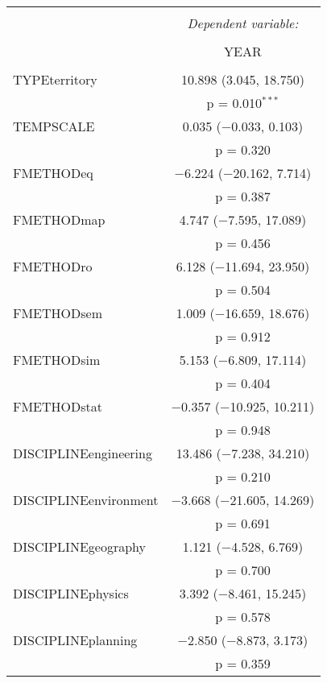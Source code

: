 
\begin{table}[!htbp] \centering 
  \caption{} 
  \label{} 
\begin{tabular}{@{\extracolsep{5pt}}lc} 
\\[-1.8ex]\hline 
\hline \\[-1.8ex] 
 & \multicolumn{1}{c}{\textit{Dependent variable:}} \\ 
\cline{2-2} 
\\[-1.8ex] & YEAR \\ 
\hline \\[-1.8ex] 
 TYPEterritory & 10.898 (3.045, 18.750) \\ 
  & p = 0.010$^{***}$ \\ 
  TEMPSCALE & 0.035 ($-$0.033, 0.103) \\ 
  & p = 0.320 \\ 
  FMETHODeq & $-$6.224 ($-$20.162, 7.714) \\ 
  & p = 0.387 \\ 
  FMETHODmap & 4.747 ($-$7.595, 17.089) \\ 
  & p = 0.456 \\ 
  FMETHODro & 6.128 ($-$11.694, 23.950) \\ 
  & p = 0.504 \\ 
  FMETHODsem & 1.009 ($-$16.659, 18.676) \\ 
  & p = 0.912 \\ 
  FMETHODsim & 5.153 ($-$6.809, 17.114) \\ 
  & p = 0.404 \\ 
  FMETHODstat & $-$0.357 ($-$10.925, 10.211) \\ 
  & p = 0.948 \\ 
  DISCIPLINEengineering & 13.486 ($-$7.238, 34.210) \\ 
  & p = 0.210 \\ 
  DISCIPLINEenvironment & $-$3.668 ($-$21.605, 14.269) \\ 
  & p = 0.691 \\ 
  DISCIPLINEgeography & 1.121 ($-$4.528, 6.769) \\ 
  & p = 0.700 \\ 
  DISCIPLINEphysics & 3.392 ($-$8.461, 15.245) \\ 
  & p = 0.578 \\ 
  DISCIPLINEplanning & $-$2.850 ($-$8.873, 3.173) \\ 
  & p = 0.359 \\ 

\end{tabular}
\end{table}
